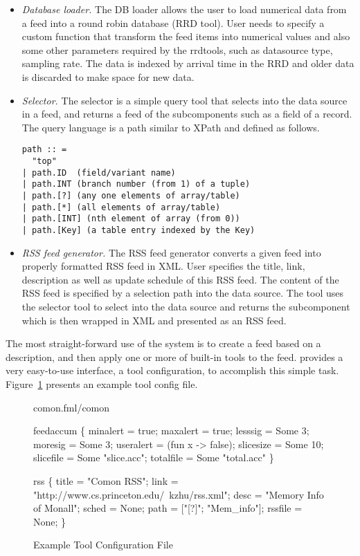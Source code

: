 \begin{itemize}
\item {\em Database loader.} The DB loader allows the user to load numerical
data from a feed into a round robin database (RRD tool). User needs to specify
a custom function that transform the feed items into numerical values
and also some other parameters required by the rrdtools, such as datasource
type, sampling rate. The data is indexed by arrival time in the RRD and
older data is discarded to make space for new data.

\item {\em Selector.} The selector is a simple query tool that selects
into the data source in a feed, and returns a feed of the subcomponents 
such as a field of a record. The query language is a path similar to XPath
and defined as follows.

{\small
\begin{verbatim}
path :: =  
  "top"
| path.ID  (field/variant name)
| path.INT (branch number (from 1) of a tuple)
| path.[?] (any one elements of array/table) 
| path.[*] (all elements of array/table) 
| path.[INT] (nth element of array (from 0))
| path.[Key] (a table entry indexed by the Key)
\end{verbatim}
}

\item {\em RSS feed generator.} The RSS feed generator converts a given
\padsd{} feed into properly formatted RSS feed in XML. User specifies
the title, link, description as well as update schedule of this RSS feed.
The content of the RSS feed is specified by a selection path into
the data source. The tool uses the selector tool to
select into the data source and returns the subcomponent which is then
wrapped in XML and presented as an RSS feed.
\end{itemize}

The most straight-forward use of the \padsd{} system is to create a feed 
based on a \padsd{} description, and then apply one or more of built-in tools 
to the feed. \padsd{} provides a very 
easy-to-use interface, a tool configuration, to accomplish this simple task. 
Figure~\ref{fig:toolconfigs} presents an example tool config file.

\begin{figure}[tb]
\centering
\begin{codebox}
 comon.fml/comon

 feedaccum
\{
  minalert  = true;
  maxalert  = true;
  lesssig   = Some 3;
  moresig   = Some 3;
  useralert = (fun x -> false);
  slicesize = Some 10;
  slicefile = Some "slice.acc";
  totalfile = Some "total.acc"
\}

 rss
\{
  title = "Comon RSS";
  link  = "http://www.cs.princeton.edu/~kzhu/rss.xml";
  desc  = "Memory Info of Monall";
  sched = None; 
  path  = ["[?]"; "Mem_info"];
  rssfile = None; 
\}
\end{codebox}
\caption{Example Tool Configuration File}
\label{fig:toolconfigs}
\end{figure}

